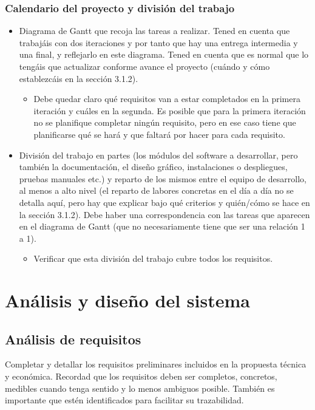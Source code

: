 \documentclass[12pt]{article}%
\begin{document}
\subsubsection{Calendario del proyecto y divisi\'on del trabajo}
\begin{itemize}
	\item Diagrama de Gantt que recoja las tareas a realizar. Tened en cuenta que trabaj\'ais con dos iteraciones y por tanto que hay una entrega intermedia y una final, y reflejarlo en este diagrama. Tened en cuenta que es normal que lo teng\'ais que actualizar conforme avance el proyecto (cu\'ando y c\'omo establezc\'ais en la secci\'on 3.1.2).
	\begin{itemize}
		\item Debe quedar claro qu\'e requisitos van a estar completados en la primera iteraci\'on y cu\'ales en la segunda. Es posible que para la primera iteraci\'on no se planifique completar ning\'un requisito, pero en ese caso tiene que planificarse qu\'e se har\'a y que faltar\'a por hacer para cada requisito.
	\end{itemize}
	\item Divisi\'on del trabajo en partes (los m\'odulos del software a desarrollar, pero tambi\'en  la documentaci\'on, el diseño gr\'afico, instalaciones o despliegues, pruebas manuales etc.) y reparto de los mismos entre el equipo de desarrollo, al menos a alto nivel (el reparto de labores concretas en el d\'ia a d\'ia no se detalla aqu\'i, pero hay que explicar bajo qu\'e criterios y qui\'en/c\'omo se hace en la secci\'on 3.1.2). Debe haber una correspondencia con las tareas que aparecen en el diagrama de Gantt (que no necesariamente tiene que ser una relaci\'on 1 a 1).
	\begin{itemize}
		\item Verificar que esta divisi\'on del trabajo cubre todos los requisitos.
	\end{itemize}
\end{itemize}



\section{An\'alisis y diseño del sistema} %

\subsection{An\'alisis de requisitos}
Completar y detallar los requisitos preliminares incluidos en la propuesta t\'ecnica y econ\'omica. Recordad que los requisitos deben ser completos, concretos, medibles cuando tenga sentido y lo menos ambiguos posible. Tambi\'en es importante que est\'en identificados para facilitar su trazabilidad.
\end{document}

